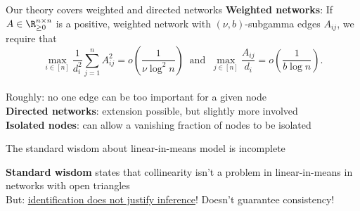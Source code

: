\documentclass[aspectratio=169]{beamer}
\theoremstyle{remark}
\begin{document}
\begin{frame}{Our theory covers weighted and directed networks}
    \textbf{Weighted networks}: If $A \in \R^{n \times n}_{\ge 0}$ is a positive, weighted network with $(\nu, b)$-subgamma edges $A_{ij}$, we require that
    \begin{equation*}
        \max_{i \in [n]} \frac{1}{d_i^2} \sum_{j=1}^n A_{ij}^2
        = o\left( \frac{ 1 }{ \nu \log^2 n } \right)
        ~\text{ and }~
        \max_{j \in [n]} \frac{ A_{ij} }{ d_i }
        = o\left( \frac{ 1 }{ b \log n } \right).
    \end{equation*} \\
    Roughly: no one edge can be too important for a given node \\
    \vspace{4mm}
    \textbf{Directed networks}: extension possible, but slightly more involved \\
    \vspace{4mm}
    \textbf{Isolated nodes}: can allow a vanishing fraction of nodes to be isolated
\end{frame}


\begin{frame}{The standard wisdom about linear-in-means model is incomplete}
    
    \textbf{Standard wisdom} states that collinearity isn't a problem in linear-in-means in networks with open triangles \citep{bramoulle2009} \\
    
    \vspace{4mm}
    But: \underline{identification does not justify inference}! Doesn't guarantee consistency! \\
    
\end{frame}






\end{document}
